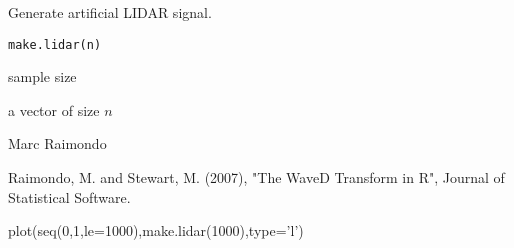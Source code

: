 \begin{Description}\relax
Generate artificial LIDAR signal.
\end{Description}
\begin{Usage}
\begin{verbatim}
make.lidar(n)
\end{verbatim}
\end{Usage}
\begin{Arguments}
\begin{ldescription}
\item[\code{n}] sample size
\end{ldescription}
\end{Arguments}
\begin{Value}
a vector of size $n$
\end{Value}
\begin{Author}\relax
Marc Raimondo
\end{Author}
\begin{References}\relax
Raimondo, M. and Stewart, M. (2007),
"The WaveD Transform in R", Journal of Statistical Software.
\end{References}
\begin{SeeAlso}\relax
{}
\end{SeeAlso}
\begin{Examples}
\begin{ExampleCode}
plot(seq(0,1,le=1000),make.lidar(1000),type='l')
\end{ExampleCode}
\end{Examples}

